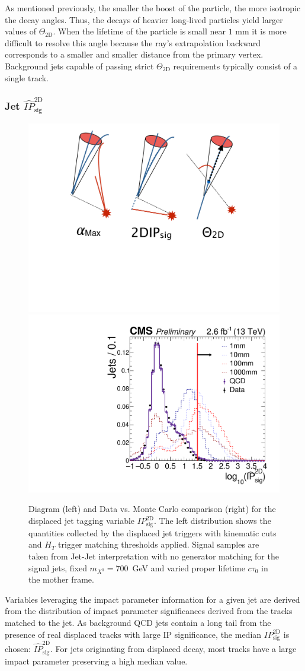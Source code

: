 As mentioned previously, the smaller the boost of the particle, the more isotropic the decay angles. Thus, the decays of heavier long-lived particles
yield larger values of $\Theta_{\textrm{2D}}$. When the lifetime of the particle is small near $1$ mm it is more difficult to resolve this angle because the
ray's extrapolation backward corresponds to a smaller and smaller distance from the primary vertex. Background jets capable of passing strict $\Theta_{\textrm{2D}}$ requirements typically consist of a single track. 

\subsubsection{Jet $\widehat{IP}_{\textrm{sig}}^{\textrm{2D}}$}

\begin{figure}
\begin{center}
\includegraphics[width=.2\textwidth]{figures/pas/DIAGRAMS/ip_diag.pdf}
\includegraphics[width=.5\textwidth]{figures/pas/SELECTION/76x_pu/DJET_ipsig2d.pdf}
\caption{Diagram (left) and Data vs. Monte Carlo comparison (right) for the displaced jet tagging variable $IP_{\textrm{sig}}^{\textrm{2D}}$. 
The left distribution  shows the quantities collected by the displaced jet triggers with kinematic cuts and $H_T$ trigger
 matching thresholds applied. Signal samples are taken from Jet-Jet interpretation with no generator matching for the signal
 jets, fixed $m_{X^0}=700$~GeV and varied proper lifetime $c\tau_0$ in the mother frame. 
 \label{fig:2dipsig}}
\end{center}
\end{figure}
Variables leveraging the impact parameter information for a given jet are derived from the distribution of impact parameter significances derived
from the tracks matched to the jet. As background QCD jets contain a long tail from the presence of real displaced tracks with large IP significance,
the median $IP_{\textrm{sig}}^{\textrm{2D}}$ is chosen: $\widehat{IP}^{\textrm{2D}}_{\textrm{sig}}$. For jets originating from displaced decay, most tracks have a large impact parameter 
preserving a high median value. 

